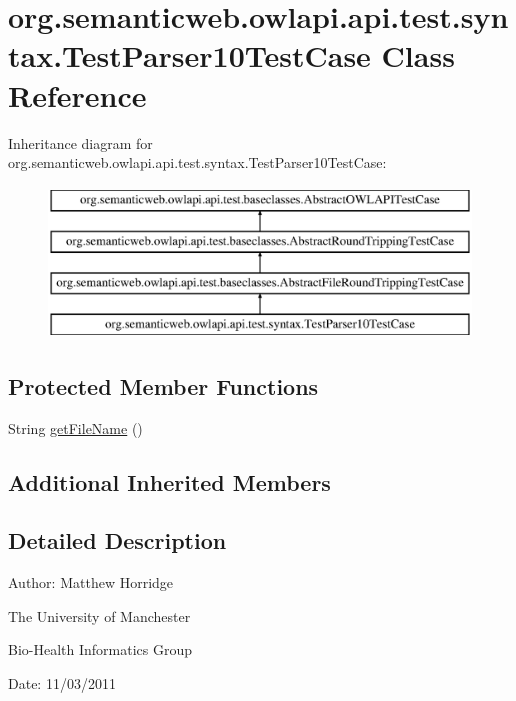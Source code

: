 \hypertarget{classorg_1_1semanticweb_1_1owlapi_1_1api_1_1test_1_1syntax_1_1_test_parser10_test_case}{\section{org.\-semanticweb.\-owlapi.\-api.\-test.\-syntax.\-Test\-Parser10\-Test\-Case Class Reference}
\label{classorg_1_1semanticweb_1_1owlapi_1_1api_1_1test_1_1syntax_1_1_test_parser10_test_case}
}
Inheritance diagram for org.\-semanticweb.\-owlapi.\-api.\-test.\-syntax.\-Test\-Parser10\-Test\-Case\-:\begin{figure}[H]
\begin{center}
\leavevmode
\includegraphics[height=4.000000cm]{classorg_1_1semanticweb_1_1owlapi_1_1api_1_1test_1_1syntax_1_1_test_parser10_test_case}
\end{center}
\end{figure}
\subsection*{Protected Member Functions}
\begin{DoxyCompactItemize}
\item 
String \hyperlink{classorg_1_1semanticweb_1_1owlapi_1_1api_1_1test_1_1syntax_1_1_test_parser10_test_case_a82b18878fb364295d73349ce5c808fff}{get\-File\-Name} ()
\end{DoxyCompactItemize}
\subsection*{Additional Inherited Members}


\subsection{Detailed Description}
Author\-: Matthew Horridge\par
 The University of Manchester\par
 Bio-\/\-Health Informatics Group\par
 Date\-: 11/03/2011 

